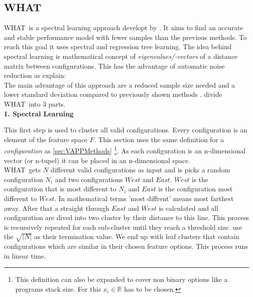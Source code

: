 \subsection{WHAT}\label{sec:WHAT}
\newcommand{\WHAT}{WHAT}

\WHAT~is a spectral learning approach developt by \citet{FasterDiscoveryofFasterSystemConfigurationsSiegmund2017}. It aims to find an accurate and stable performance model with fewer samples than the previous methods. To reach this goal it uses spectral and regression tree learning. The idea behind spectral learning is mathematical concept of \textit{eigenvalues/-vectors} of a distance matrix between configurations. This has the advantage of automatic noise reduction as \citet{FasterDiscoveryofFasterSystemConfigurationsSiegmund2017} explain: \\
The main advantage of this approach are a reduced sample size needed and a lower standard deviation compared to previously shown methods \cite{FasterDiscoveryofFasterSystemConfigurationsSiegmund2017}.
\citet{FasterDiscoveryofFasterSystemConfigurationsSiegmund2017} divide \WHAT~into 3 parts.\\

\textbf{1. Spectral Learning}

This first step is used to cluster all valid configurations. Every configuration is an element of the feature space $F$. This section uses the same definition for a \textit{configuration} as \cref{sec:VAPPMethods} \footnote{This definition can also be expanded to cover non binary options like a programs stack size. For this $x_i\in\mathbb{R}$ has to be chosen.}. As each configuration is an n-dimensional vector (or n-tupel) it can be placed in an n-dimensional space.\\
\WHAT~gets $N$ different valid configurations as input and is picks a random configuration $N_i$ and two configurations $West$ and  $East$. $West$ is the configuration that is most different to $N_i$ and $East$ is the configuration most different to $West$. In mathematical terms 'most diffrent' means most farthest away. After that a straight through $East$ and $West$ is calculated and all configuration are dived into two cluster by their distance to this line. This process is recursively repeated for each sub-cluster until they reach a threshold size. \citet{FasterDiscoveryofFasterSystemConfigurationsSiegmund2017} use the $\sqrt{|N|}$ as their termination value. We end up with leaf clusters that contain configurations which are similar in their chosen feature options. This process runs in linear time\cite{FasterDiscoveryofFasterSystemConfigurationsSiegmund2017}.\\

